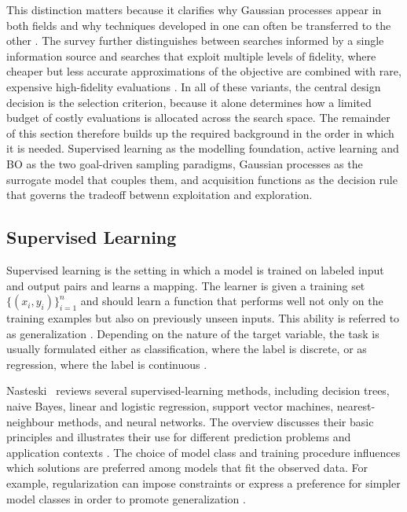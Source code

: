 \documentclass[12pt,a4paper]{report}
\begin{document}
        This distinction matters because it clarifies why Gaussian processes appear in both fields and why techniques developed in one can often be transferred to the other \cite{di2024active}. The survey further distinguishes between searches informed by a single information source and searches that exploit multiple levels of fidelity, where cheaper but less accurate approximations of the objective are combined with rare, expensive high-fidelity evaluations \cite{di2024active}. In all of these variants, the central design decision is the selection criterion, because it alone determines how a limited budget of costly evaluations is allocated across the search space. The remainder of this section therefore builds up the required background in the order in which it is needed. Supervised learning as the modelling foundation, active learning and BO as the two goal-driven sampling paradigms, Gaussian processes as the surrogate model that couples them, and acquisition functions as the decision rule that governs the tradeoff betwenn exploitation and exploration.

        \subsection{Supervised Learning}
        Supervised learning is the setting in which a model is trained on labeled input and output pairs and learns a mapping. The learner is given a training set $\{(x_i,y_i)\}_{i=1}^{n}$ and should learn a function that performs well not only on the training examples but also on previously unseen inputs. This ability is referred to as generalization \cite{Goodfellow-et-al-2016}. Depending on the nature of the target variable, the task is usually formulated either as classification, where the label is discrete, or as regression, where the label is continuous \cite{nasteski2017overview}.

        Nasteski~\cite{nasteski2017overview} reviews several supervised-learning methods, including decision trees, naive Bayes, linear and logistic regression, support vector machines, nearest-neighbour methods, and neural networks. The overview discusses their basic principles and illustrates their use for different prediction problems and application contexts \cite{nasteski2017overview}. The choice of model class and training procedure influences which solutions are preferred among models that fit the observed data. For example, regularization can impose constraints or express a preference for simpler model classes in order to promote generalization \cite{Goodfellow-et-al-2016}.
\end{document}
